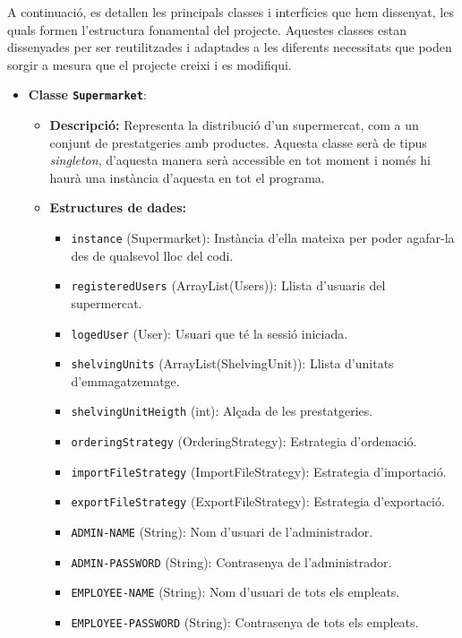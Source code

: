 \documentclass[a4paper,12pt]{report}
\begin{document}
	A continuació, es detallen les principals classes i interfícies que hem dissenyat, les quals formen l'estructura fonamental del projecte. Aquestes classes estan dissenyades per ser reutilitzades i adaptades a les diferents necessitats que poden sorgir a mesura que el projecte creixi i es modifiqui.

	\begin{itemize}
		\item \textbf{Classe \texttt{Supermarket}}:
		\begin{itemize}
			\item \textbf{Descripció:} Representa la distribució d'un supermercat, com a un conjunt de prestatgeries amb productes. Aquesta classe serà de tipus \textit{singleton}, d'aquesta manera serà accessible en tot moment i només hi haurà una instància d'aquesta en tot el programa.
			\item \textbf{Estructures de dades:}
			\begin{itemize}
				\item \texttt{instance} (Supermarket): Instància d'ella mateixa per poder agafar-la des de qualsevol lloc del codi.
				\item \texttt{registeredUsers} (ArrayList(Users)): Llista d'usuaris del supermercat.
				\item \texttt{logedUser} (User): Usuari que té la sessió iniciada.
				\item \texttt{shelvingUnits} (ArrayList(ShelvingUnit)): Llista d'unitats d'emmagatzematge.
				\item \texttt{shelvingUnitHeigth} (int): Alçada de les prestatgeries.
				\item \texttt{orderingStrategy} (OrderingStrategy): Estrategia d'ordenació.
				\item \texttt{importFileStrategy} (ImportFileStrategy): Estrategia d'importació.
				\item \texttt{exportFileStrategy} (ExportFileStrategy): Estrategia d'exportació.
				\item \texttt{ADMIN-NAME} (String): Nom d'usuari de l'administrador.
				\item \texttt{ADMIN-PASSWORD} (String): Contrasenya de l'administrador.
				\item \texttt{EMPLOYEE-NAME} (String): Nom d'usuari de tots els empleats.
				\item \texttt{EMPLOYEE-PASSWORD} (String): Contrasenya de tots els empleats.
			\end{itemize}
		\end{itemize}

\end{itemize}
\end{document}
